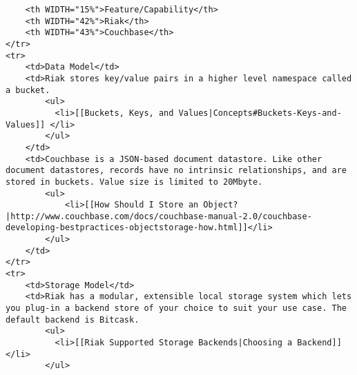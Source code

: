 \documentclass[letter]{book}
\begin{document}
\begin{shaded}\begin{verbatim}
    <th WIDTH="15%">Feature/Capability</th>
    <th WIDTH="42%">Riak</th>
    <th WIDTH="43%">Couchbase</th>
</tr>
<tr>
    <td>Data Model</td>
    <td>Riak stores key/value pairs in a higher level namespace called a bucket.
        <ul>
          <li>[[Buckets, Keys, and Values|Concepts#Buckets-Keys-and-Values]] </li>
        </ul>
    </td>
    <td>Couchbase is a JSON-based document datastore. Like other document datastores, records have no intrinsic relationships, and are stored in buckets. Value size is limited to 20Mbyte.
        <ul>
            <li>[[How Should I Store an Object?|http://www.couchbase.com/docs/couchbase-manual-2.0/couchbase-developing-bestpractices-objectstorage-how.html]]</li>
        </ul>
    </td>
</tr>
<tr>
    <td>Storage Model</td>
    <td>Riak has a modular, extensible local storage system which lets you plug-in a backend store of your choice to suit your use case. The default backend is Bitcask.
        <ul>
          <li>[[Riak Supported Storage Backends|Choosing a Backend]]</li>
        </ul>


\end{verbatim}
\end{shaded}
\end{document}
